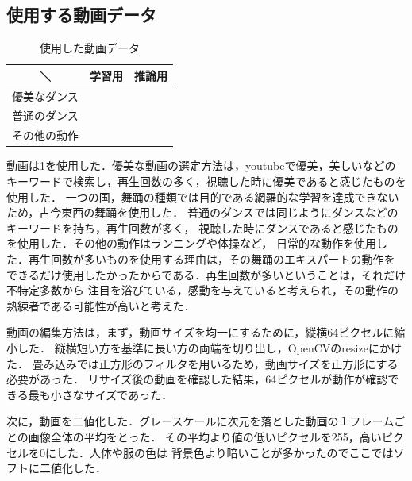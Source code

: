 \subsection{使用する動画データ}
\begin{table}[t]
  \begin{center}
    \begin{tabular}{|c|c|c|} \hline
      ＼ & 学習用 & 推論用 \\ \hline
      優美なダンス
        & \cite{jpn}\cite{china}\cite{ballet}\cite{thai}\cite{jpn2}
        & \cite{balletgroup}\cite{jpngroup}\cite{chinagroup}\cite{belly}
      \\ \hline
      普通のダンス
        & \cite{ariana}\cite{kadokawa}\cite{bts}\cite{manolo}\cite{aito}
        & \cite{btsgroup}\cite{arashi}\cite{hyoga}\cite{legit}
      \\ \hline
      その他の動作
        & \cite{radio}\cite{posing}\cite{boxing}\cite{running}\cite{shinkokyu}\cite{leaves}
        & \cite{radio2}
      \\ \hline
    \end{tabular}
  \end{center}
  \caption{使用した動画データ}
  \label{video_data}
\end{table}

動画は\ref{video_data}を使用した．優美な動画の選定方法は，youtubeで優美，美しいなどの
キーワードで検索し，再生回数の多く，視聴した時に優美であると感じたものを使用した．
一つの国，舞踊の種類では目的である網羅的な学習を達成できないため，古今東西の舞踊を使用した．
普通のダンスでは同じようにダンスなどのキーワードを持ち，再生回数が多く，
視聴した時にダンスであると感じたものを使用した．その他の動作はランニングや体操など，
日常的な動作を使用した．再生回数が多いものを使用する理由は，その舞踊のエキスパートの動作を
できるだけ使用したかったからである．再生回数が多いということは，それだけ不特定多数から
注目を浴びている，感動を与えていると考えられ，その動作の熟練者である可能性が高いと考えた．

動画の編集方法は，まず，動画サイズを均一にするために，縦横64ピクセルに縮小した．
縦横短い方を基準に長い方の両端を切り出し，OpenCVのresize\cite{resize}にかけた．
畳み込みでは正方形のフィルタを用いるため，動画サイズを正方形にする必要があった．
リサイズ後の動画を確認した結果，64ピクセルが動作が確認できる最も小さなサイズであった．

次に，動画を二値化した．グレースケールに次元を落とした動画の１フレームごとの画像全体の平均をとった．
その平均より値の低いピクセルを255，高いピクセルを0にした．人体や服の色は
背景色より暗いことが多かったのでここではソフトに二値化した．

